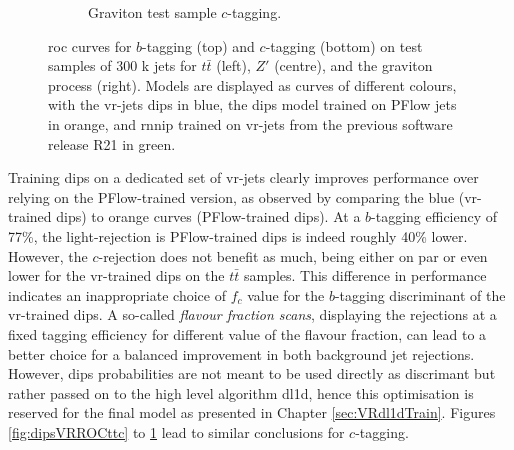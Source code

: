\begin{figure}
\begin{subfigure}[t]{0.3\textwidth}
    \caption{Graviton test sample $c$-tagging.}
    \label{fig:dipsVRROCgrc}
  \end{subfigure}
  \caption{\gls{roc} curves for $b$-tagging (top) and $c$-tagging (bottom) on test samples of 300 k jets for $t\bar{t}$ (left), $Z'$ (centre), and the graviton process (right). Models are displayed as curves of different colours, with the \gls{vr}-jets \gls{dips} in blue, the \gls{dips} model trained on PFlow jets in orange, and \gls{rnnip} trained on \gls{vr}-jets from the previous software release R21 in green.}
  \label{fig:dipsVRROC}
\end{figure}

Training \gls{dips} on a dedicated set of \gls{vr}-jets clearly improves performance over relying on the PFlow-trained version, as observed by comparing the blue (\gls{vr}-trained \gls{dips}) to orange curves (PFlow-trained \gls{dips}). At a $b$-tagging efficiency of 77\%, the light-rejection is PFlow-trained \gls{dips} is indeed roughly 40\% lower. However, the $c$-rejection does not benefit as much, being either on par or even lower for the \gls{vr}-trained \gls{dips} on the $t\bar{t}$ samples. This difference in performance indicates an inappropriate choice of $f_c$ value for the $b$-tagging discriminant of the \gls{vr}-trained \gls{dips}. A so-called \textit{flavour fraction scans}, displaying the rejections at a fixed tagging efficiency for different value of the flavour fraction, can lead to a better choice for a balanced improvement in both background jet rejections. However, \gls{dips} probabilities are not meant to be used directly as discrimant but rather passed on to the high level algorithm \gls{dl1d}, hence this optimisation is reserved for the final model as presented in Chapter \ref{sec:VRdl1dTrain}. Figures \ref{fig:dipsVRROCttc} to \ref{fig:dipsVRROCgrc} lead to similar conclusions for $c$-tagging.

